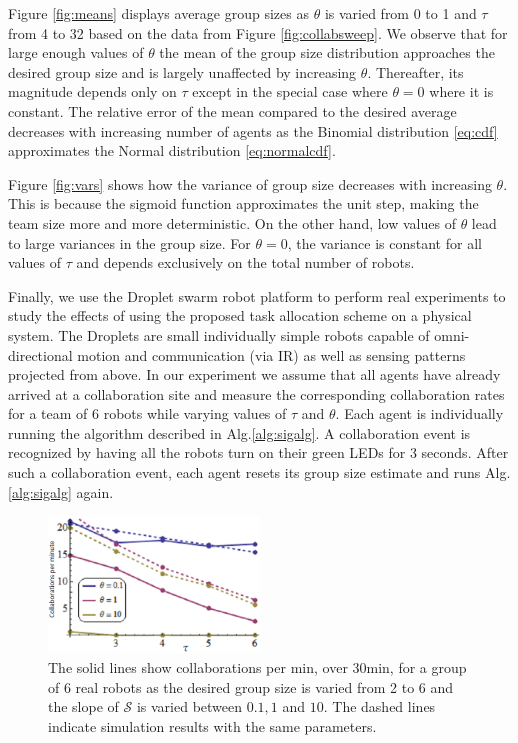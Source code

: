 \documentclass{TeXstyles/DARS/svmult}  %
\newcommand{\sig}{\mathcal{S}}
\begin{document}
Figure \ref{fig:means} displays average group sizes as $\theta$ is varied from 0 to 1 and $\tau$ from 4 to 32 based on the data from Figure \ref{fig:collabsweep}. We observe that for large enough values of $\theta$ the mean of the group size distribution approaches the desired group size and is largely unaffected by increasing $\theta$. Thereafter, its magnitude depends only on $\tau$ except in the special case where $\theta = 0$ where it is constant. The relative error of the mean compared to the desired average decreases with increasing number of agents as the  Binomial distribution \eqref{eq:cdf}
approximates the Normal distribution \eqref{eq:normalcdf}.

Figure \ref{fig:vars} shows how the variance of group size decreases with increasing $\theta$. This is because the sigmoid function approximates the unit step, making the team size more and more deterministic. On the other hand, low values of $\theta$ lead to large variances in the group size. For $\theta=0$, the variance is constant for all values of $\tau$ and depends exclusively on the total number of robots. 

Finally, we use the Droplet swarm robot platform to perform real experiments to study the effects of using the proposed task allocation scheme on a physical system. The Droplets are small individually simple robots capable of omni-directional motion and communication (via IR) as well as sensing patterns projected from above. In our experiment we assume that all agents have already arrived at a collaboration site and measure the corresponding collaboration rates for a team of 6 robots while varying values of $\tau$ and $\theta$. Each agent is individually running the algorithm described in Alg.\ref{alg:sigalg}. A collaboration event is recognized by having all the robots turn on their green LEDs for 3 seconds. After such a collaboration event, each agent resets its group size estimate and runs Alg.\ref{alg:sigalg} again. 

\begin{figure}[!htb]
\centering\includegraphics[width=0.5\textwidth]{figures/realsimexp.png}
\caption{The solid lines show collaborations per min, over 30min, for a group of 6 real robots as the desired group size is varied from 2 to 6 and the slope of $\sig$ is varied between $0.1, 1$ and $10$. The dashed lines indicate simulation results with the same parameters.\label{fig:expdat} }
\end{figure}
\end{document}
